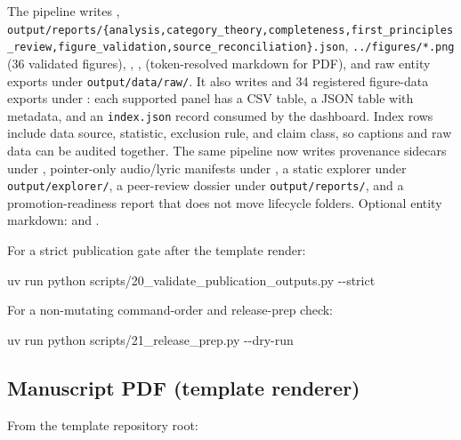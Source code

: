 \documentclass[
]{article}
\newenvironment{Shaded}{}{}
\newcommand{\AttributeTok}[1]{\textcolor[rgb]{0.49,0.56,0.16}{#1}}
\newcommand{\ExtensionTok}[1]{#1}
\newcommand{\NormalTok}[1]{#1}
\begin{document}
The pipeline writes ,
\texttt{output/reports/\{analysis,category\_theory,completeness,first\_principles\_review,figure\_validation,source\_reconciliation\}.json},
\texttt{../figures/*.png} (36 validated figures),
,
,
 (token-resolved markdown for PDF), and raw
entity exports under \texttt{output/data/raw/}. It also writes
 and 34 registered
figure-data exports under : each supported
panel has a CSV table, a JSON table with metadata, and an
\texttt{index.json} record consumed by the dashboard. Index rows include
data source, statistic, exclusion rule, and claim class, so captions and
raw data can be audited together. The same pipeline now writes
provenance sidecars under , pointer-only
audio/lyric manifests under , a static
explorer under \texttt{output/explorer/}, a peer-review dossier under
\texttt{output/reports/}, and a promotion-readiness report that does not
move lifecycle folders. Optional entity markdown:
 and
.

For a strict publication gate after the template render:

\begin{Shaded}
\begin{Highlighting}[]
\ExtensionTok{uv}\NormalTok{ run python scripts/20\_validate\_publication\_outputs.py }\AttributeTok{{-}{-}strict}
\end{Highlighting}
\end{Shaded}

For a non-mutating command-order and release-prep check:

\begin{Shaded}
\begin{Highlighting}[]
\ExtensionTok{uv}\NormalTok{ run python scripts/21\_release\_prep.py }\AttributeTok{{-}{-}dry{-}run}
\end{Highlighting}
\end{Shaded}

\subsection{Manuscript PDF (template
renderer)}\label{manuscript-pdf-template-renderer}

From the template repository root:
\end{document}
